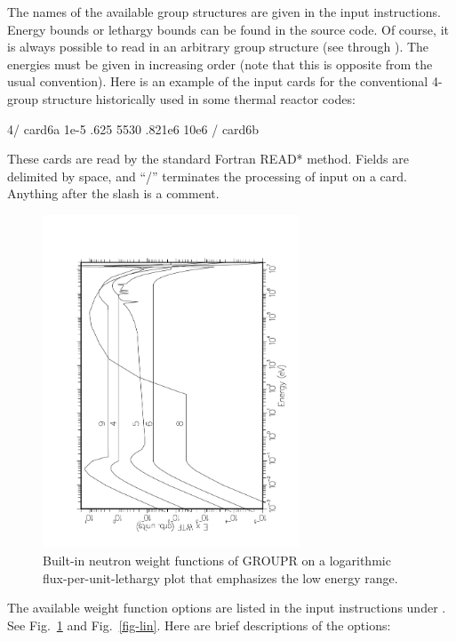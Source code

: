 The names of the available group structures are given in the input
instructions. Energy bounds or lethargy bounds can be found in the
source code.  Of course, it is always possible to read in an arbitrary
group structure (see  through ).  The energies
must be given in increasing order (note that this is opposite from the
usual convention).  Here is an example of the input cards for the
conventional 4-group structure historically used in some thermal
reactor codes:

\small
\begin{ccode}

   4/ card6a
   1e-5 .625 5530 .821e6 10e6 / card6b

\end{ccode}
\normalsize

\noindent
These cards are read by the standard Fortran READ* method.
Fields are delimited by space, and ``/'' terminates the processing
of input on a card.  Anything after the slash is a comment.

\begin{figure}[t]\centering
\includegraphics[keepaspectratio, height=3.9in, angle=270]{figs/appb1ack}
\caption[GROUPR weight functions on a logarithmic flux/unit lethargy
 scale]{Built-in neutron weight functions of GROUPR on a logarithmic
 flux-per-unit-lethargy plot that emphasizes the low energy range.}
\label{fig-leth}
\end{figure}

The available weight function options are listed in the input
instructions under .  See Fig.~\ref{fig-leth} and
Fig.~\ref{fig-lin}.  Here are brief descriptions of the options:

